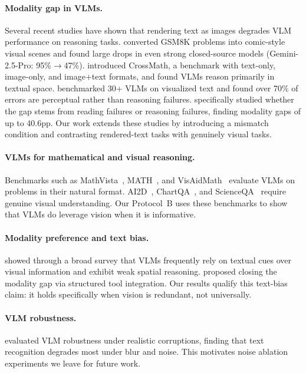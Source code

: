 \documentclass[11pt]{article}
\begin{document}
\paragraph{Modality gap in VLMs.}
Several recent studies have shown that rendering text as images degrades VLM performance on reasoning tasks. \citet{zhang2025gsm8kv} converted GSM8K problems into comic-style visual scenes and found large drops in even strong closed-source models (Gemini-2.5-Pro: 95\%$\to$47\%). \citet{wang2026crossmath} introduced CrossMath, a benchmark with text-only, image-only, and image+text formats, and found VLMs reason primarily in textual space. \citet{chen2026vista} benchmarked 30+ VLMs on visualized text and found over 70\% of errors are perceptual rather than reasoning failures. \citet{liu2026readingnotthinking} specifically studied whether the gap stems from reading failures or reasoning failures, finding modality gaps of up to 40.6pp. Our work extends these studies by introducing a mismatch condition and contrasting rendered-text tasks with genuinely visual tasks.

\paragraph{VLMs for mathematical and visual reasoning.}
Benchmarks such as MathVista~\cite{lu2023mathvista}, MATH~\cite{hendrycks2021math}, and VisAidMath~\cite{wu2024visaidmath} evaluate VLMs on problems in their natural format. AI2D~\cite{kembhavi2016ai2d}, ChartQA~\cite{masry2022chartqa}, and ScienceQA~\cite{lu2022scienceqa} require genuine visual understanding. Our Protocol~B uses these benchmarks to show that VLMs do leverage vision when it is informative.

\paragraph{Modality preference and text bias.}
\citet{ijcai2025wordspixels} showed through a broad survey that VLMs frequently rely on textual cues over visual information and exhibit weak spatial reasoning. \citet{zhang2026vistira} proposed closing the modality gap via structured tool integration. Our results qualify this text-bias claim: it holds specifically when vision is redundant, not universally.

\paragraph{VLM robustness.}
\citet{chen2026vlmrobust} evaluated VLM robustness under realistic corruptions, finding that text recognition degrades most under blur and noise. This motivates noise ablation experiments we leave for future work.
\end{document}
